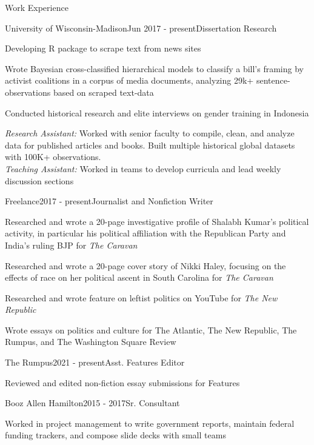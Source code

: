 \documentclass{resume}
\begin{document}
\begin{rSection}{Work Experience}
\begin{rSubsection}{University of Wisconsin-Madison}{Jun 2017 - present}{Dissertation Research}{}
\item Developing \textsf{R} package to scrape text from news sites
\item Wrote Bayesian cross-classified hierarchical models to classify a bill's framing by activist coalitions in a corpus of media documents, analyzing 29k+ sentence-observations based on scraped text-data
\item Conducted historical research and elite interviews on gender training in Indonesia
\end{rSubsection}

{\it Research Assistant:} Worked with senior faculty to compile, clean, and analyze data for published articles and books. Built multiple historical global datasets with 100K+ observations. \\
{\it Teaching Assistant:} Worked in teams to develop curricula and lead weekly discussion sections

\begin{rSubsection}{Freelance}{2017 - present}{Journalist and Nonfiction Writer}{}
\item Researched and wrote a 20-page investigative profile of Shalabh Kumar's political activity, in particular his political affiliation with the Republican Party and India's ruling BJP for {\it The Caravan}
\item Researched and wrote a 20-page cover story of Nikki Haley, focusing on the effects of race on her political ascent in South Carolina for {\it The Caravan}
\item Researched and wrote feature on leftist politics on YouTube for {\it The New Republic}
\item Wrote essays on politics and culture for The Atlantic, The New Republic, The Rumpus, and The Washington Square Review
\end{rSubsection}

\begin{rSubsection}{The Rumpus}{2021 - present}{Asst. Features Editor}{}
\item Reviewed and edited non-fiction essay submissions for Features
\end{rSubsection}

\begin{rSubsection}{Booz Allen Hamilton}{2015 - 2017}{Sr. Consultant}{}
\item Worked in project management to write government reports, maintain federal funding trackers, and compose slide decks with small teams
\end{rSubsection}
\end{rSection}
% 
\end{document}
